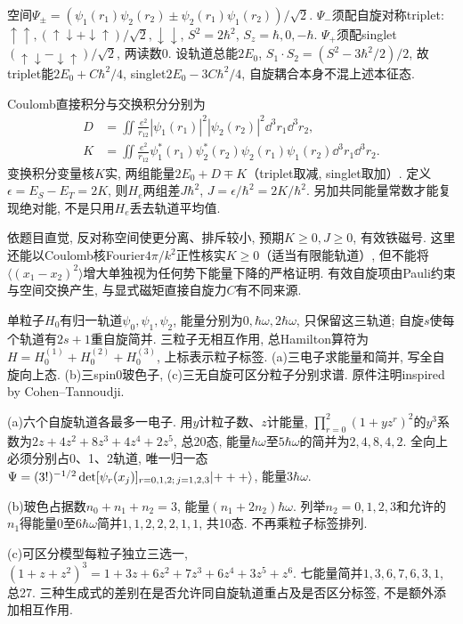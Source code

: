 \begin{solution}
空间$\Psi_\pm=(\psi_1(r_1)\psi_2(r_2)\pm\psi_2(r_1)\psi_1(r_2))/\sqrt2$. $\Psi_-$须配自旋对称triplet:$\uparrow\uparrow,(\uparrow\downarrow+\downarrow\uparrow)/\sqrt2,\downarrow\downarrow$, $S^2=2\hbar^2$, $S_z=\hbar,0,-\hbar$. $\Psi_+$须配singlet$(\uparrow\downarrow-\downarrow\uparrow)/\sqrt2$, 两读数0. 设轨道总能$2E_0$, $S_1\cdot S_2=(S^2-3\hbar^2/2)/2$, 故triplet能$2E_0+C\hbar^2/4$, singlet$2E_0-3C\hbar^2/4$, 自旋耦合本身不混上述本征态.

Coulomb直接积分与交换积分分别为
\begin{align*}
D&=\iint\frac{e^2}{r_{12}}|\psi_1(r_1)|^2|\psi_2(r_2)|^2\dd^3r_1\dd^3r_2,\\
K&=\iint\frac{e^2}{r_{12}}\psi_1^*(r_1)\psi_2^*(r_2)\psi_2(r_1)\psi_1(r_2)\dd^3r_1\dd^3r_2.
\end{align*}
 变换积分变量核$K$实, 两组能量$2E_0+D\mp K$（triplet取减, singlet取加）. 定义$\epsilon=E_S-E_T=2K$, 则$H_e$两组差$J\hbar^2$, $J=\epsilon/\hbar^2=2K/\hbar^2$. 另加共同能量常数才能复现绝对能, 不是只用$H_e$丢去轨道平均值.

依题目直觉, 反对称空间使更分离、排斥较小, 预期$K\ge0,J\ge0$, 有效铁磁号. 这里还能以Coulomb核Fourier$4\pi/k^2$正性核实$K\ge0$（适当有限能轨道）, 但不能将$\langle(x_1-x_2)^2\rangle$增大单独视为任何势下能量下降的严格证明. 有效自旋项由Pauli约束与空间交换产生, 与显式磁矩直接自旋力$C$有不同来源.
\end{solution}

\begin{exercise}
单粒子$H_0$有归一轨道$\psi_0,\psi_1,\psi_2$, 能量分别为$0,\hbar\omega,2\hbar\omega$, 只保留这三轨道; 自旋$s$使每个轨道有$2s+1$重自旋简并. 三粒子无相互作用, 总Hamilton算符为$H=H_0^{(1)}+H_0^{(2)}+H_0^{(3)}$, 上标表示粒子标签. (a)三电子求能量和简并, 写全自旋向上态. (b)三spin0玻色子, (c)三无自旋可区分粒子分别求谱. 原件注明inspired by Cohen--Tannoudji.
\end{exercise}
\begin{solution}
(a)六个自旋轨道各最多一电子. 用$y$计粒子数、$z$计能量, $\prod_{r=0}^2(1+yz^r)^2$的$y^3$系数为$2z+4z^2+8z^3+4z^4+2z^5$, 总20态, 能量$\hbar\omega$至$5\hbar\omega$的简并为$2,4,8,4,2$. 全向上必须分别占0、1、2轨道, 唯一归一态
$\Psi=(3!)^{-1/2}\det[\psi_{r}(x_j)]_{r=0,1,2;\,j=1,2,3}\lvert +++\rangle$,
能量$3\hbar\omega$.

(b)玻色占据数$n_0+n_1+n_2=3$, 能量$(n_1+2n_2)\hbar\omega$. 列举$n_2=0,1,2,3$和允许的$n_1$得能量0至$6\hbar\omega$简并$1,1,2,2,2,1,1$, 共10态. 不再乘粒子标签排列.

(c)可区分模型每粒子独立三选一, $(1+z+z^2)^3=1+3z+6z^2+7z^3+6z^4+3z^5+z^6$. 七能量简并$1,3,6,7,6,3,1$, 总27. 三种生成式的差别在是否允许同自旋轨道重占及是否区分标签, 不是额外添加相互作用.
\end{solution}
